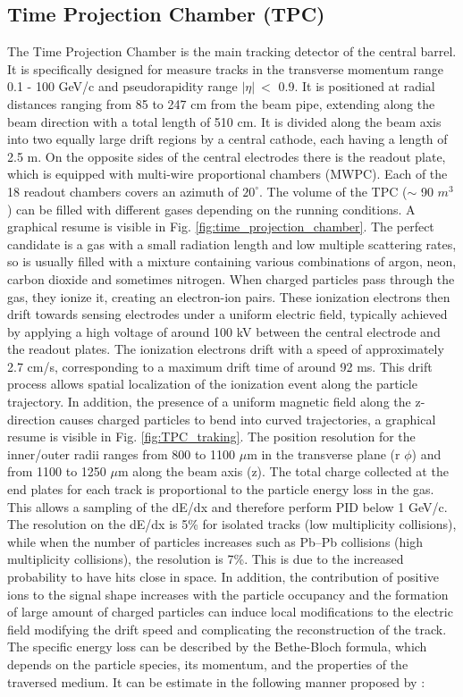 \documentclass[12pt,a4paper]{book}
\begin{document}
	\subsection{Time Projection Chamber (TPC)}
	The Time Projection Chamber is the main tracking detector of the central barrel. It is specifically designed for measure tracks in the transverse momentum range 0.1 - 100 GeV/c and pseudorapidity range $|\eta| \ <$ 0.9.  It is positioned at radial distances ranging from 85 to 247 cm from the beam pipe, extending along the beam direction with a total length of 510 cm. It is divided along the beam axis into two equally large drift regions by a central cathode, each having a length of 2.5 m. On the opposite sides of the central electrodes there is the readout plate, which is equipped with multi-wire proportional chambers (MWPC). Each of the 18 readout chambers covers an azimuth of $20^{\circ}$. The volume of the TPC ($\sim$ 90 $m^3$) can be filled with different gases depending on the running conditions. A graphical resume is visible in Fig. \ref{fig:time_projection_chamber}. The perfect candidate is a gas with a small radiation length and low multiple scattering rates, so is usually filled with a mixture containing various combinations of argon, neon, carbon dioxide and sometimes nitrogen. When charged particles pass through the gas, they ionize it, creating an electron-ion pairs. These ionization electrons then drift towards sensing electrodes under a uniform electric field, typically achieved by applying a high voltage of around 100 kV between the central electrode and the readout plates. The ionization electrons drift with a speed of approximately 2.7 cm/s, corresponding to a maximum drift time of around 92 ms. This drift process allows spatial localization of the ionization event along the particle trajectory. In addition, the presence of a uniform magnetic field along the z-direction causes charged particles to bend into curved trajectories, a graphical resume is visible in Fig. \ref{fig:TPC_traking}. The position resolution for the inner/outer radii ranges from 800 to 1100 $\mu$m in the transverse plane (r $\phi$) and from 1100 to 1250 $\mu$m along the beam axis (z). The total charge collected at the end plates for each track is proportional to the particle energy loss in the gas. This allows a sampling of the dE/dx and therefore perform PID below 1 GeV/c. The resolution on the dE/dx is 5\% for isolated tracks (low multiplicity collisions), while when the number of particles increases such as Pb–Pb collisions (high multiplicity collisions), the resolution is 7\%. This is due to the increased probability to have hits close in space. In addition, the contribution of positive ions to the signal shape increases with the particle occupancy and the formation of large amount of charged particles can induce local modifications to the electric field modifying the drift speed and complicating the reconstruction of the track. The specific energy loss can be described by the Bethe-Bloch formula, which depends on the particle species, its momentum, and the properties of the traversed medium. It can be estimate in the following manner proposed by \cite{Rolandi:2008ujz}:
\end{document}
